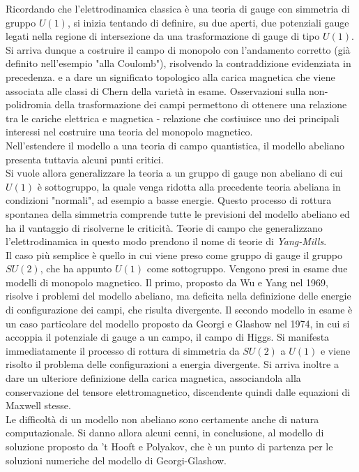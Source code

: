 Ricordando che l'elettrodinamica classica è una teoria di gauge con simmetria
di gruppo $U(1)$, si inizia tentando di definire, su due aperti, due potenziali
gauge legati nella regione di intersezione da una trasformazione di
gauge di tipo $U(1)$. Si arriva dunque a costruire il campo di monopolo
con l'andamento corretto (già definito nell'esempio "alla Coulomb"), risolvendo
la contraddizione evidenziata in precedenza. e a dare un significato topologico
alla carica magnetica che viene associata alle classi di Chern della varietà
in esame.
Osservazioni sulla non-polidromia della trasformazione dei campi permettono di
ottenere una relazione tra le cariche elettrica e magnetica - relazione che costiuisce
uno dei principali interessi nel costruire una teoria del monopolo magnetico.\\
Nell'estendere il modello a una teoria di campo quantistica,
il modello abeliano presenta tuttavia alcuni punti critici.\\

Si vuole allora generalizzare la teoria a un gruppo di gauge non abeliano di cui
$U(1)$ è sottogruppo, la quale venga ridotta alla precedente teoria abeliana in
condizioni "normali", ad esempio a basse energie.
Questo processo di rottura spontanea della simmetria comprende tutte le previsioni
del modello abeliano ed ha il vantaggio di risolverne le criticità.
Teorie di campo che generalizzano
l'elettrodinamica in questo modo prendono il nome di teorie di \emph{Yang-Mills}.\\
Il caso più semplice è quello in cui viene preso come gruppo di gauge il gruppo
$SU(2)$, che ha appunto $U(1)$ come sottogruppo.
Vengono presi in esame due modelli di monopolo magnetico.
Il primo, proposto da Wu e Yang nel 1969, risolve i problemi del modello abeliano,
ma deficita nella definizione delle energie di configurazione dei campi, che
risulta divergente.
Il secondo modello in esame è un caso
particolare del modello proposto da Georgi e Glashow nel 1974, in cui
si accoppia il potenziale di gauge a un campo, il campo di Higgs. Si manifesta
immediatamente il processo di rottura di simmetria da $SU(2)$ a $U(1)$ e viene
risolto il problema delle configurazioni a energia divergente. Si arriva inoltre
a dare un ulteriore definizione della carica magnetica, associandola alla
conservazione del tensore elettromagnetico, discendente quindi dalle equazioni di
Maxwell stesse.\\

Le difficoltà di un modello non abeliano sono certamente anche di natura
computazionale. Si danno allora alcuni cenni, in conclusione, al modello di
soluzione proposto da 't Hooft e Polyakov, che è un punto di partenza per le
soluzioni numeriche del modello di Georgi-Glashow.


